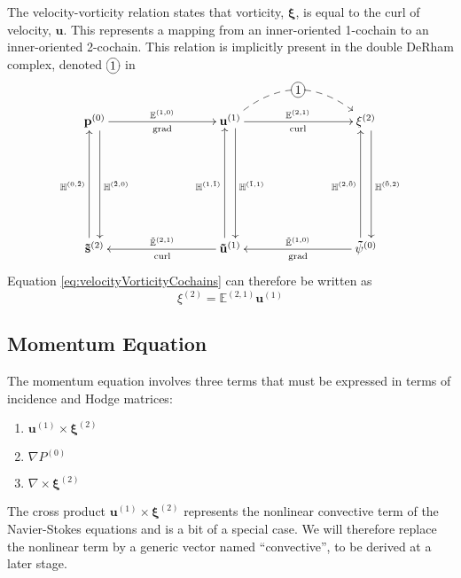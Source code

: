 The velocity-vorticity relation states that vorticity, $\mathbf{\xi}$, is equal to the curl of velocity, $\mathbf{u}$. This represents a mapping from an inner-oriented 1-cochain to an inner-oriented 2-cochain. This relation is implicitly present in the double DeRham complex, denoted $\xymatrix{*+[o][F-]{1}}$ in
\begin{equation}
    \begin{gathered}
        \xymatrix@=20ex{
            \mathbf{p}^{(0)} \ar[r]^{\mathbb{E}^{(1,0)}}_{\text{grad}} \ar@<1ex>[d]^{\mathbb{H}^{(\tilde{2},0)}} & \mathbf{u}^{(1)} \ar[r]^{\mathbb{E}^{(2,1)}}_{\text{curl}} \ar @/^6ex/ @{-->} [r]|-*+[o][F-]{1} \ar@<1ex>[d]^{\mathbb{H}^{(\tilde{1},1)}} & \mathbf{\xi}^{(2)} \ar@<1ex>[d]^{\mathbb{H}^{(\tilde{0},2)}} \\
            \mathbf{\tilde{s}}^{(2)} \ar@<1ex>[u]^{\mathbb{H}^{(0,\tilde{2})}} & \mathbf{\tilde{u}}^{(1)} \ar[l]_{\tilde{\mathbb{E}}^{(2, 1)}}^{\text{curl}} \ar@<1ex>[u]^{\mathbb{H}^{(1,\tilde{1})}} & \mathbf{\tilde{\psi}}^{(0)} \ar[l]_{\tilde{\mathbb{E}}^{(1,0)}}^{\text{grad}} \ar@<1ex>[u]^{\mathbb{H}^{(2,\tilde{0})}}
        }
    \end{gathered}
    \label{eq:DeRhamVelocityVorticity}
\end{equation}
Equation \ref{eq:velocityVorticityCochains} can therefore be written as
\begin{equation}
    \xi^{(2)} = \mathbb{E}^{(2,1)} \mathbf{u}^{(1)}
\end{equation}

\subsection{Momentum Equation}

The momentum equation involves three terms that must be expressed in terms of incidence and Hodge matrices:
\begin{enumerate}
    \item $\mathbf{u}^{(1)} \times \mathbf{\xi}^{(2)}$
    \item $\nabla P^{(0)}$
    \item $\nabla \times \mathbf{\xi}^{(2)}$
\end{enumerate}


The cross product $\mathbf{u}^{(1)} \times \mathbf{\xi}^{(2)}$ represents the nonlinear convective term of the Navier-Stokes equations and is a bit of a special case. We will therefore replace the nonlinear term by a generic vector named ``convective'', to be derived at a later stage.

